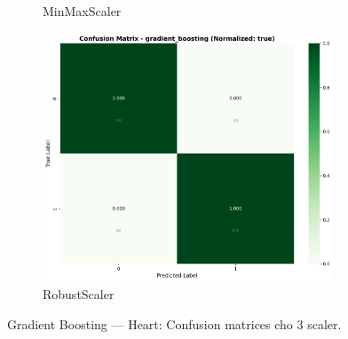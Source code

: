 \begin{figure}[H]
\begin{subfigure}[b]{0.31\textwidth}
\caption{MinMaxScaler}\label{fig:gb_heart_cm_minmax}
\end{subfigure}\hfill
\begin{subfigure}[b]{0.31\textwidth}\centering
\includegraphics[width=0.95\textwidth]{Result/heart_dataset/confusion_matrices/gradient_boosting_numeric_dataset_RobustScaler.png}
\caption{RobustScaler}\label{fig:gb_heart_cm_robust}
\end{subfigure}
\caption{Gradient Boosting — Heart: Confusion matrices cho 3 scaler.}
\label{fig:gb_heart_confusions}
\end{figure}

